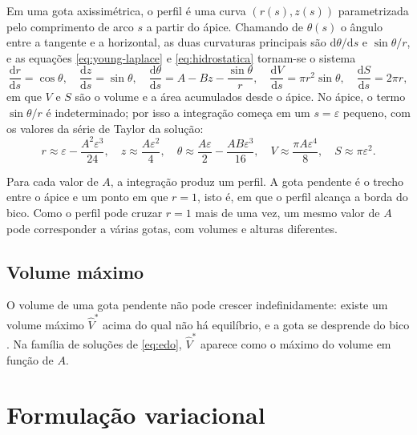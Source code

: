 \documentclass[12pt, oneside, a4paper, english, brazil]{abntex2}
\theoremstyle{relatorio}
\theoremstyle{relatorioit}
\theoremstyle{problema}
\newcommand{\Vh}{\hat V}
\begin{document}
Em uma gota axissimétrica, o perfil é uma curva $(r(s), z(s))$ parametrizada pelo
comprimento de arco $s$ a partir do ápice. Chamando de $\theta(s)$ o ângulo entre a
tangente e a horizontal, as duas curvaturas principais são $\mathrm{d}\theta/\mathrm{d}s$
e $\sin\theta/r$, e as equações \eqref{eq:young-laplace} e \eqref{eq:hidrostatica}
tornam-se o sistema \parencite{hartland1976}
\begin{equation}
  \frac{\mathrm{d}r}{\mathrm{d}s} = \cos\theta, \quad
  \frac{\mathrm{d}z}{\mathrm{d}s} = \sin\theta, \quad
  \frac{\mathrm{d}\theta}{\mathrm{d}s} = A - B z - \frac{\sin\theta}{r}, \quad
  \frac{\mathrm{d}V}{\mathrm{d}s} = \pi r^2 \sin\theta, \quad
  \frac{\mathrm{d}S}{\mathrm{d}s} = 2\pi r,
  \label{eq:edo}
\end{equation}
em que $V$ e $S$ são o volume e a área acumulados desde o ápice. No ápice, o termo
$\sin\theta/r$ é indeterminado; por isso a integração começa em um $s = \varepsilon$
pequeno, com os valores da série de Taylor da solução:
\begin{equation}
  r \approx \varepsilon - \frac{A^2 \varepsilon^3}{24}, \quad
  z \approx \frac{A \varepsilon^2}{4}, \quad
  \theta \approx \frac{A \varepsilon}{2} - \frac{A B \varepsilon^3}{16}, \quad
  V \approx \frac{\pi A \varepsilon^4}{8}, \quad
  S \approx \pi \varepsilon^2.
  \label{eq:taylor}
\end{equation}

Para cada valor de $A$, a integração produz um perfil. A gota pendente é o trecho entre
o ápice e um ponto em que $r = 1$, isto é, em que o perfil alcança a borda do bico. Como
o perfil pode cruzar $r = 1$ mais de uma vez, um mesmo valor de $A$ pode corresponder a
várias gotas, com volumes e alturas diferentes.

\subsection{Volume máximo}

O volume de uma gota pendente não pode crescer indefinidamente: existe um volume
máximo $\Vh^*$ acima do qual não há equilíbrio, e a gota se desprende do bico
\parencite{padday1973}. Na família de soluções de \eqref{eq:edo}, $\Vh^*$ aparece como
o máximo do volume em função de $A$.

\section{Formulação variacional}
\end{document}
